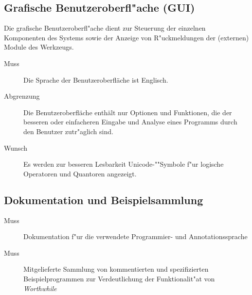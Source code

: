 \subsection{Grafische Benutzeroberfl"ache (GUI)}%

Die grafische Benutzeroberfl"ache dient zur Steuerung der einzelnen Komponenten des Systems sowie der Anzeige von R"uckmeldungen der (externen) Module des Werkzeugs.%

\begin{description}%
    \item [Muss] Die Sprache der Benutzeroberfläche ist Englisch.%
    \item [Abgrenzung] Die Benutzeroberfläche enthält nur Optionen und Funktionen, die der besseren oder einfacheren Eingabe und Analyse eines Programms durch den Benutzer zutr"aglich sind.%
    \item [Wunsch] Es werden zur besseren Lesbarkeit Unicode-""Symbole f"ur logische Operatoren und Quantoren angezeigt.%
\end{description}%

\subsection{Dokumentation und Beispielsammlung}%

\begin{description}%
    \item [Muss] Dokumentation f"ur die verwendete Programmier- und Annotationssprache%
    \item [Muss] Mitgelieferte Sammlung von kommentierten und spezifizierten Beispielprogrammen zur Verdeutlichung der Funktionalit"at von \textit{Worthwhile}%
\end{description}%
